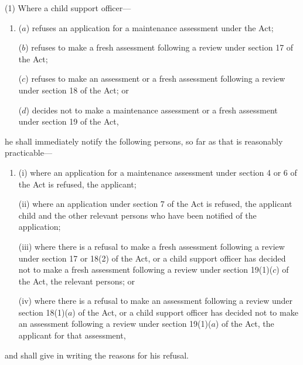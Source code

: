\documentclass[a4paper]{article}
\begin{document}
%
%
%
%
(1) Where a child support officer—
\begin{enumerate}\item[]
($a$) refuses an application for a maintenance assessment under the Act;

($b$) refuses to make a fresh assessment following a review under section 17 of the Act;

($c$) refuses to make an assessment or a fresh assessment following a review under section 18 of the Act; or

($d$) decides not to make a maintenance assessment or a fresh assessment under section 19 of the Act,
\end{enumerate}
he shall immediately notify the following persons, so far as that is reasonably practicable—
\begin{enumerate}\item[]
(i) where an application for a maintenance assessment under section 4 or 6 of the Act is refused, the applicant;

(ii) where an application under section 7 of the Act is refused, the applicant child and the other relevant persons who have been notified of the application;

(iii) where there is a refusal to make a fresh assessment following a review under section 17 or 18(2) of the Act, or a child support officer has decided not to make a fresh assessment following a review under section 19(1)($c$) of the Act, the relevant persons; or

(iv) where there is a refusal to make an assessment following a review under section 18(1)($a$) of the Act, or a child support officer has decided not to make an assessment following a review under section 19(1)($a$) of the Act, the applicant for that assessment,
\end{enumerate}
and shall give in writing the reasons for his refusal.
\end{document}

